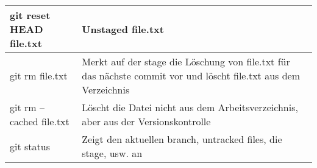 \begin{longtable}{|p{7cm}|p{8cm}|}
		  	\rowcolor{tablerowcolor_orange}
		  	git reset HEAD file.txt & Unstaged file.txt
		  	\\ \hline


		  	\rowcolor{tablerowcolor_cyan}
		  	git rm file.txt & Merkt auf der stage die Löschung von file.txt für das nächste commit vor und löscht file.txt aus dem Verzeichnis
		  	\\ \hline
		  	\rowcolor{tablerowcolor_cyan}
		  	git rm --cached file.txt & Löscht die Datei nicht aus dem Arbeitsverzeichnis, aber aus der Versionskontrolle
		  	\\ \hline


		  	\rowcolor{tablerowcolor_orange}
		  	git status & Zeigt den aktuellen branch, untracked files, die stage, usw. an
		  	\\ \hline		  	


		\end{longtable}
